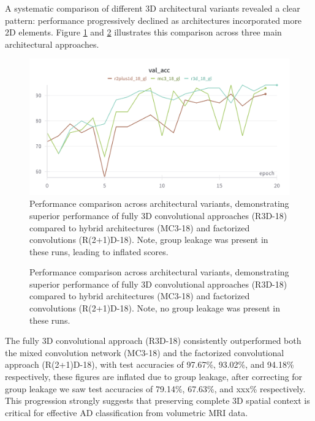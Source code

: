 \documentclass[12pt, a4paper]{article}
\begin{document}
A systematic comparison of different 3D architectural variants revealed a clear pattern: performance progressively declined as architectures incorporated more 2D elements. Figure \ref{fig:architecture_comparison_gl} and \ref{fig:architecture_comparison} illustrates this comparison across three main architectural approaches.
\begin{figure}[htbp]
  \centering
  \includegraphics[width=\textwidth]{figures/archs_acc_gl.png}
  \caption{Performance comparison across architectural variants, demonstrating superior performance of fully 3D convolutional approaches (R3D-18) compared to hybrid architectures (MC3-18) and factorized convolutions (R(2+1)D-18). Note, group leakage was present in these runs, leading to inflated scores.}
  \label{fig:architecture_comparison_gl}
\end{figure}

\begin{figure}[htbp]
  \centering
  \caption{Performance comparison across architectural variants, demonstrating superior performance of fully 3D convolutional approaches (R3D-18) compared to hybrid architectures (MC3-18) and factorized convolutions (R(2+1)D-18). Note, no group leakage was present in these runs.}
  \label{fig:architecture_comparison}
\end{figure}

The fully 3D convolutional approach (R3D-18) consistently outperformed both the mixed convolution network (MC3-18) and the factorized convolutional approach (R(2+1)D-18), with test accuracies of 97.67\%, 93.02\%, and 94.18\% respectively, these figures are inflated due to group leakage, after correcting for group leakage we saw test accuracies of 79.14\%, 67.63\%, and xxx\% respectively. This progression strongly suggests that preserving complete 3D spatial context is critical for effective AD classification from volumetric MRI data.
\end{document}

